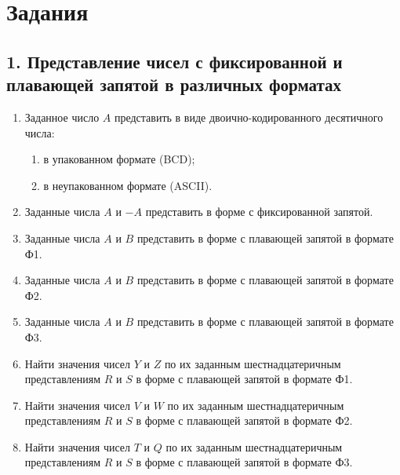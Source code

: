 \section*{Задания}

\subsection*{1. Представление чисел с фиксированной и плавающей запятой в различных форматах}

\begin{enumerate}
    \item Заданное число $A$ представить в виде двоично-кодированного
    десятичного числа:
    \begin{enumerate}
        \item в упакованном формате (BCD);
        \item в неупакованном формате (ASCII).
    \end{enumerate}

    \item Заданные числа $A$ и $-A$ представить в форме с фиксированной
    запятой.

    \item Заданные числа $A$ и $B$ представить в форме с плавающей
    запятой в формате Ф1.

    \item Заданные числа $A$ и $B$ представить в форме с плавающей
    запятой в формате Ф2.

    \item Заданные числа $A$ и $B$ представить в форме с плавающей
    запятой в формате Ф3.

    \item Найти значения чисел $Y$ и $Z$ по их заданным
    шестнадцатеричным представлениям $R$ и $S$ в форме с плавающей
    запятой в формате Ф1.

    \item Найти значения чисел $V$ и $W$ по их заданным
    шестнадцатеричным представлениям $R$ и $S$ в форме с плавающей
    запятой в формате Ф2.

    \item Найти значения чисел $T$ и $Q$ по их заданным
    шестнадцатеричным представлениям $R$ и $S$ в форме с плавающей
    запятой в формате Ф3.
\end{enumerate}

